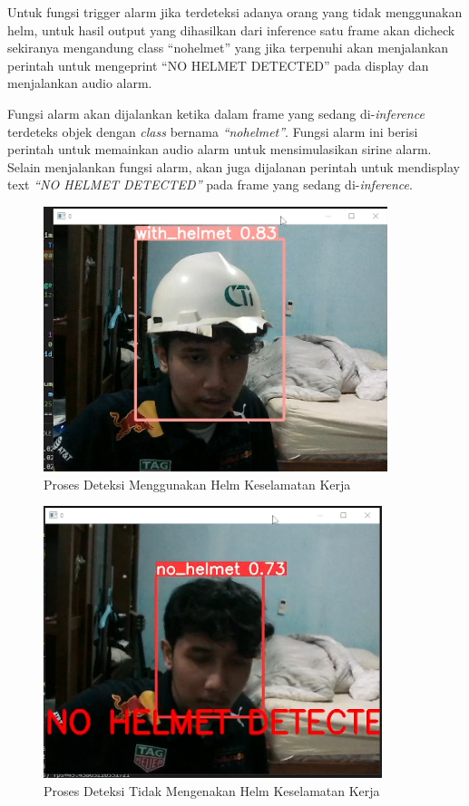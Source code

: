 Untuk fungsi trigger alarm jika terdeteksi adanya orang yang tidak menggunakan helm, untuk hasil output yang dihasilkan dari inference satu frame akan dicheck sekiranya mengandung class “no\textunderscore helmet” yang jika terpenuhi akan  menjalankan perintah untuk mengeprint “NO HELMET DETECTED” pada display dan menjalankan audio alarm. 

Fungsi alarm akan dijalankan ketika dalam frame yang sedang di-\emph{inference} terdeteks objek dengan \emph{class} bernama \emph{“no\textunderscore helmet”}. Fungsi alarm ini berisi perintah untuk memainkan audio alarm untuk mensimulasikan sirine alarm. Selain menjalankan fungsi alarm, akan juga dijalanan perintah untuk mendisplay text \emph{“NO HELMET DETECTED”} pada frame yang sedang di-\emph{inference}. 

\begin{figure}[ht]
  \centering
  \includegraphics[scale=1]{gambar/Screenshot_90.png}
  \caption{Proses Deteksi Menggunakan Helm Keselamatan Kerja}
  \label{fig:deteksiwthhelm}  
\end{figure}

\begin{figure}[ht]
  \centering
  \includegraphics[scale=1]{gambar/Screenshot_91.png}
  \caption{Proses Deteksi Tidak Mengenakan Helm Keselamatan Kerja}
  \label{fig:deteksinohelm}  
\end{figure}


